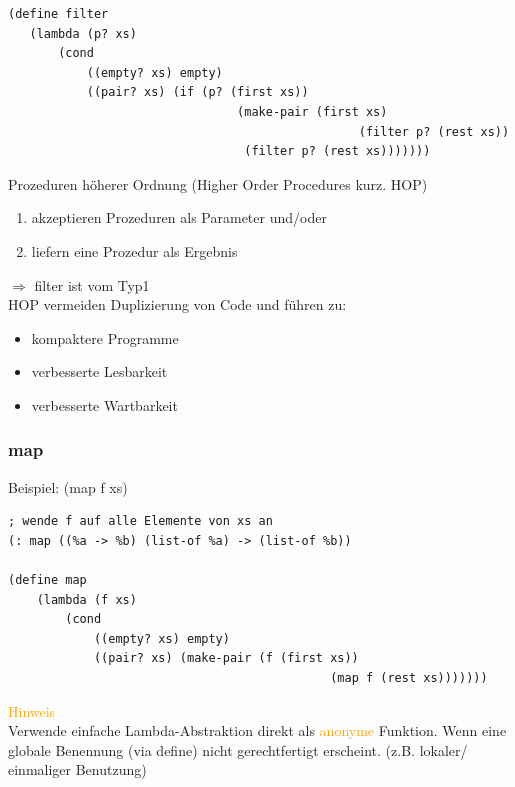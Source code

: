 \documentclass[paper=a4, fontsize=11pt]{scrartcl}
\numberwithin{equation}{section}
\numberwithin{figure}{section}
\numberwithin{table}{section}
\begin{document}
\begin{lstlistig}
\begin{lstlisting}
(define filter
   (lambda (p? xs)
       (cond
           ((empty? xs) empty)
           ((pair? xs) (if (p? (first xs))
                                (make-pair (first xs)
                                                 (filter p? (rest xs))
                                 (filter p? (rest xs)))))))                 
\end{lstlisting}

Prozeduren höherer Ordnung (Higher Order Procedures kurz. HOP) \\
\begin{enumerate}
\item akzeptieren Prozeduren als Parameter und/oder 
\item liefern eine Prozedur als Ergebnis
\end{enumerate}

$\Rightarrow$ filter ist vom Typ1 \\

HOP vermeiden Duplizierung von Code und führen zu: \\
\begin{itemize}
\item kompaktere Programme
\item verbesserte Lesbarkeit
\item verbesserte Wartbarkeit
\end{itemize}

\subsubsection{map}
Beispiel: (map f xs)


\begin{lstlisting}
; wende f auf alle Elemente von xs an
(: map ((%a -> %b) (list-of %a) -> (list-of %b))

(define map
    (lambda (f xs)
        (cond
            ((empty? xs) empty)
            ((pair? xs) (make-pair (f (first xs))
                                             (map f (rest xs)))))))
\end{lstlisting}

\textcolor{orange}{Hinweis} \\
Verwende einfache Lambda-Abstraktion direkt als \textcolor{orange}{anonyme} Funktion. Wenn eine globale Benennung (via define) nicht gerechtfertigt erscheint. (z.B. lokaler/ einmaliger Benutzung) \\


\end{lstlistig}
\end{document}
